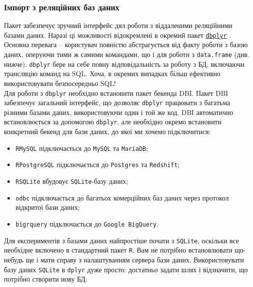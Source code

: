 \documentclass[
]{book}
\providecommand{\tightlist}{%
  \setlength{\itemsep}{0pt}\setlength{\parskip}{0pt}}
\begin{document}
\hypertarget{ux456ux43cux43fux43eux440ux442-ux437-ux440ux435ux43bux44fux446ux456ux439ux43dux438ux445-ux431ux430ux437-ux434ux430ux43dux438ux445}{%
\subsubsection{Імпорт з реляційних баз даних}\label{ux456ux43cux43fux43eux440ux442-ux437-ux440ux435ux43bux44fux446ux456ux439ux43dux438ux445-ux431ux430ux437-ux434ux430ux43dux438ux445}}

Пакет \citep{R-dplyr} забезпечує зручний інтерфейс дял роботи з віддаленими реляційними базами даних. Наразі ці можливості відокремлені в окремий пакет \href{https://cran.rstudio.com/web/packages/dbplyr/vignettes/dbplyr.html}{\texttt{dbplyr}} \citep{R-dbplyr}.
Основна перевага -- користувач повністю абстрагується від факту роботи з базою даних, оперуючи тими ж самими командами, що і для роботи з \texttt{data.frame} (див. нижче). \texttt{dbplyr} бере на себе повну відповідальність за роботу з БД, включаючи трансляцію команд на SQL. Хоча, в окремих випадках більш ефективно використовувати безпосередньо SQL!\\
Для роботи з \texttt{dbplyr} необхідно встановити пакет бекенда DBI. Пакет DBI забезпечує загальний інтерфейс, що дозволяє \texttt{dbplyr} працювати з багатьма різними базами даних, використовуючи один і той же код. DBI автоматично встановлюється за допомогою \texttt{dbplyr}, але необхідно окремо встановити конкретний бекенд для бази даних, до якої ми хочемо підключитися:

\begin{itemize}
\tightlist
\item
  \texttt{RMySQL} \citep{R-RMySQL} підключається до \texttt{MySQL} та \texttt{MariaDB};
\item
  \texttt{RPostgreSQL} \citep{R-RPostgreSQL} підключається до \texttt{Postgres} та \texttt{Redshift};
\item
  \texttt{RSQLite} \citep{R-RSQLite} вбудовує \texttt{SQLite}-базу даних;
\item
  \texttt{odbc} \citep{R-odbc} підключається до багатьох комерційних баз даних через протокол відкритої бази даних;
\item
  \texttt{bigrquery} \citep{R-bigrquery} підключається до \texttt{Google\ BigQuery}.
\end{itemize}

Для експериментів з базами даних найпростіше почати з \texttt{SQLite}, оскільки все необхідне включено в стандартний пакет \texttt{R}. Вам не потрібно встановлювати що-небудь ще і мати справу з налаштуванням сервера бази даних. Використовувати базу даних \texttt{SQLite} в \texttt{dplyr} дуже просто: достатньо задати шлях і відзначити, що потрібно створити нову БД:
\end{document}
